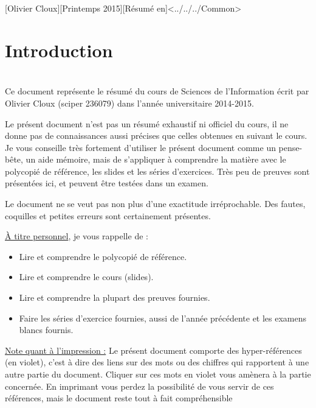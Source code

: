 \documentclass[11pt,a4paper]{article}
\begin{document}
[Olivier Cloux][Printemps 2015][Résumé en]<../../../Common>
\begin{multicols}{2}
    \tableofcontents
\end{multicols}
\newpage
{}
\setcounter{section}{-1}
\section{Introduction}
\\
Ce document représente le résumé du cours de Sciences de l'Information écrit par Olivier Cloux (sciper 236079) dans l'année universitaire 2014-2015.

Le présent document n'est pas un résumé exhaustif ni officiel du cours, il ne donne pas de connaissances aussi précises que celles obtenues en suivant le cours. Je vous conseille très fortement d'utiliser le présent document comme un pense-bête, un aide mémoire, mais de s'appliquer à comprendre la matière avec le polycopié de référence, les slides et les séries d'exercices. Très peu de preuves sont présentées ici, et peuvent être testées dans un examen.

Le document ne se veut pas non plus d'une exactitude irréprochable. Des fautes, coquilles et petites erreurs sont certainement présentes.

\uline{À titre personnel}, je vous rappelle de :
\begin{itemize}
	\item 	Lire et comprendre le polycopié de référence.
	\item 	Lire et comprendre le cours (slides).
	\item 	Lire et comprendre la plupart des preuves fournies.
	\item 	Faire les séries d'exercice fournies, aussi de l'année précédente et les examens blancs fournis.
\end{itemize}

\uline{Note quant à l'impression :} Le présent document comporte des hyper-références (en violet), c'est à dire des liens sur des mots ou des chiffres qui rapportent à une autre partie du document. Cliquer sur ces mots en violet vous amènera à la partie concernée. En imprimant vous perdez la possibilité de vous servir de ces références, mais le document reste tout à fait compréhensible
\end{document}
